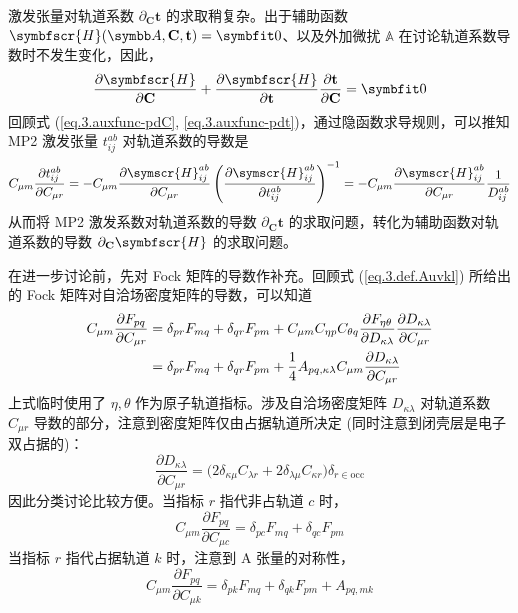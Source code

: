 激发张量对轨道系数 $\partial_\mathbf{C} \mathbf{t}$ 的求取稍复杂。出于辅助函数 $\symbfscr{H} (\mathbb{A}, \mathbf{C}, \mathbf{t}) = \bm{0}$、以及外加微扰 $\mathbb{A}$ 在讨论轨道系数导数时不发生变化，因此，
\begin{equation}
    \label{eq.3.auxfunc-pdC}
    \frac{\partial \symbfscr{H}}{\partial \mathbf{C}} + \frac{\partial \symbfscr{H}}{\partial \mathbf{t}} \frac{\partial \mathbf{t}}{\partial \mathbf{C}} = \bm{0}
\end{equation}
回顾式 (\ref{eq.3.auxfunc-pdC}, \ref{eq.3.auxfunc-pdt})，通过隐函数求导规则，可以推知 MP2 激发张量 $t_{ij}^{ab}$ 对轨道系数的导数是
\begin{align}
    \label{eq.3.relation-tpdc-fpdc}
    C_{\mu m} \frac{\partial t_{ij}^{ab}}{\partial C_{\mu r}}
    = - C_{\mu m} \frac{\partial \symscr{H}_{ij}^{ab}}{\partial C_{\mu r}} \left( \frac{\partial \symscr{H}_{ij}^{ab}}{\partial t_{ij}^{ab}} \right)^{-1}
    = - C_{\mu m} \frac{\partial \symscr{H}_{ij}^{ab}}{\partial C_{\mu r}} \frac{1}{D_{ij}^{ab}}
\end{align}
从而将 MP2 激发系数对轨道系数的导数 $\partial_\mathbf{C} \mathbf{t}$ 的求取问题，转化为辅助函数对轨道系数的导数 $\partial_\mathbf{C} \symbfscr{H}$ 的求取问题。

在进一步讨论前，先对 Fock 矩阵的导数作补充。回顾式 (\ref{eq.3.def.Auvkl}) 所给出的 Fock 矩阵对自洽场密度矩阵的导数，可以知道
\begin{align}
    C_{\mu m} \frac{\partial F_{pq}}{\partial C_{\mu r}} &= \delta_{pr} F_{mq} + \delta_{qr} F_{pm} + C_{\mu m} C_{\eta p} C_{\theta q} \frac{\partial F_{\eta \theta}}{\partial D_{\kappa \lambda}} \frac{\partial D_{\kappa \lambda}}{\partial C_{\mu r}} \notag\\
    &= \delta_{pr} F_{mq} + \delta_{qr} F_{pm} + \frac{1}{4} A_{pq, \kappa \lambda} C_{\mu m} \frac{\partial D_{\kappa \lambda}}{\partial C_{\mu r}}
\end{align}
上式临时使用了 $\eta, \theta$ 作为原子轨道指标。涉及自洽场密度矩阵 $D_{\kappa \lambda}$ 对轨道系数 $C_{\mu r}$ 导数的部分，注意到密度矩阵仅由占据轨道所决定 (同时注意到闭壳层是电子双占据的)：
\begin{equation}
    \frac{\partial D_{\kappa \lambda}}{\partial C_{\mu r}} = \big( 2 \delta_{\kappa \mu} C_{\lambda r} + 2 \delta_{\lambda \mu} C_{\kappa r} \big) \delta_{r \in \mathrm{occ}}
\end{equation}
因此分类讨论比较方便。当指标 $r$ 指代非占轨道 $c$ 时，
\begin{equation}
    C_{\mu m} \frac{\partial F_{pq}}{\partial C_{\mu c}} = \delta_{pc} F_{mq} + \delta_{qc} F_{pm}
\end{equation}
当指标 $r$ 指代占据轨道 $k$ 时，注意到 A 张量的对称性，
\begin{equation}
    C_{\mu m} \frac{\partial F_{pq}}{\partial C_{\mu k}} = \delta_{pk} F_{mq} + \delta_{qk} F_{pm} + A_{pq, mk}
\end{equation}


